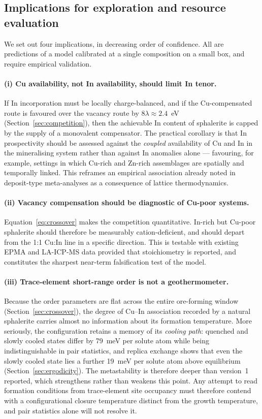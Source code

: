 \documentclass[11pt,a4paper]{article}
\begin{document}
\subsection{Implications for exploration and resource evaluation}
\label{sec:exploration}

We set out four implications, in decreasing order of confidence. All are
predictions of a model calibrated at a single composition on a small box, and
require empirical validation.

\paragraph{(i) Cu availability, not In availability, should limit In tenor.}
If In incorporation must be locally charge-balanced, and if the Cu-compensated
route is favoured over the vacancy route by $8\lambda \approx 2.4$~eV
(Section~\ref{sec:competition}), then the achievable In content of sphalerite is
capped by the supply of a monovalent compensator. The practical corollary is
that In prospectivity should be assessed against the \emph{coupled} availability
of Cu and In in the mineralising system rather than against In anomalies alone
--- favouring, for example, settings in which Cu-rich and Zn-rich assemblages are
spatially and temporally linked. This reframes an empirical association already
noted in deposit-type meta-analyses as a consequence of lattice thermodynamics.

\paragraph{(ii) Vacancy compensation should be diagnostic of Cu-poor systems.}
Equation~\eqref{eq:crossover} makes the competition quantitative. In-rich but
Cu-poor sphalerite should therefore be measurably cation-deficient, and should
depart from the 1:1 Cu:In line in a specific direction. This is testable with
existing EPMA and LA-ICP-MS data provided that stoichiometry is reported, and
constitutes the sharpest near-term falsification test of the model.

\paragraph{(iii) Trace-element short-range order is not a geothermometer.}
Because the order parameters are flat across the entire ore-forming window
(Section~\ref{sec:crossover}), the degree of Cu--In association recorded by a
natural sphalerite carries almost no information about its formation
temperature. More seriously, the configuration retains a memory of its \emph{cooling path}:
quenched and slowly cooled states differ by 79~meV per solute atom while being
indistinguishable in pair statistics, and replica exchange shows that even the
slowly cooled state lies a further 19~meV per solute atom above equilibrium
(Section~\ref{sec:ergodicity}). The metastability is therefore deeper than
version~1 reported, which strengthens rather than weakens this point. Any attempt to read formation conditions from
trace-element site occupancy must therefore contend with a configurational
closure temperature distinct from the growth temperature, and pair statistics
alone will not resolve it.
\end{document}
